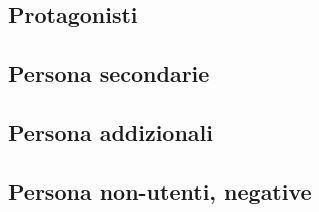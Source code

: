 \subsection{Protagonisti}







\subsection{Persona secondarie}



\subsection{Persona addizionali}



\subsection{Persona non-utenti, negative}


